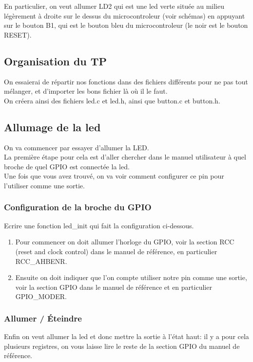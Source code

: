 \documentclass[a4paper,10pt]{article} %
\begin{document}
En particulier, on veut allumer LD2 qui est une led verte située au milieu légèrement à droite sur le dessus du microcontroleur (voir schémas) en appuyant sur le bouton B1, qui est le bouton bleu du microcontroleur (le noir est le bouton RESET).\\

\subsection{Organisation du TP}
On essaierai de répartir nos fonctions dans des fichiers différents pour ne pas tout mélanger, et d'importer les bons fichier là où il le faut.\\

On créera ainsi des fichiers led.c et led.h, ainsi que button.c et button.h.

\subsection{Allumage de la led}
On va commencer par essayer d'allumer la LED.\\

La première étape pour cela est d'aller chercher dans le manuel utilisateur à quel broche de quel GPIO est connectée la led.\\

Une fois que vous avez trouvé, on va voir comment configurer ce pin pour l'utiliser comme une sortie.

\subsubsection{Configuration de la broche du GPIO}
Ecrire une fonction led\_init qui fait la configuration ci-dessous.
\begin{enumerate}
\item Pour commencer on doit allumer l'horloge du GPIO, voir la section RCC (reset and clock control) dans le manuel de référence, en particulier RCC\_AHBENR.
\item Ensuite on doit indiquer que l'on compte utiliser notre pin comme une sortie, voir la section GPIO dans le manuel de référence et en particulier GPIO\_MODER.
\end{enumerate}

\subsubsection{Allumer / Éteindre}
Enfin on veut allumer la led et donc mettre la sortie à l'état haut: il y a pour cela plusieurs registres, on vous laisse lire le reste de la section GPIO du manuel de référence.\\
\end{document}
